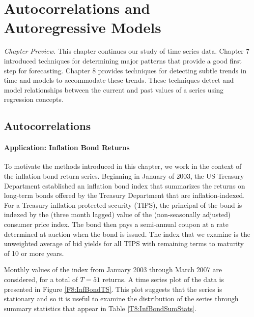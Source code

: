 \setcounter{chapter}{7}
\chapter{Autocorrelations and Autoregressive Models}
{\small \textit{Chapter Preview}. This chapter continues our study
of time series data. Chapter 7 introduced techniques for determining
major patterns that provide a good first step for forecasting.
Chapter 8 provides techniques for detecting subtle trends in time
and models to accommodate these trends. These techniques detect and
model relationships between the current and past values of a series
using regression concepts.}

\section{Autocorrelations}\label{S8:Autocorrs}


\subsubsection*{Application: Inflation Bond Returns}

To motivate the methods introduced in this chapter, we work in the
context of the inflation bond return series. Beginning in January of
2003, the US Treasury Department established an inflation bond index
that summarizes the returns on long-term bonds offered by the
Treasury Department that are inflation-indexed. For a Treasury
inflation protected security (TIPS), the principal of the bond is
indexed by the (three month lagged) value of the (non-seasonally
adjusted) consumer price index. The bond then pays a semi-annual
coupon at a rate determined at auction when the bond is issued. The
index that we examine is the unweighted average of bid yields for
all TIPS with remaining terms to maturity of 10 or more years.

Monthly values of the index from January 2003 through March 2007 are
considered, for a total of $T=51$ returns. A time series plot of the
data is presented in Figure \ref{F8:InfBondTS}. This plot suggests
that the series is stationary and so it is useful to examine the
distribution of the series through summary statistics that appear in
Table \ref{T8:InfBondSumStats}.


